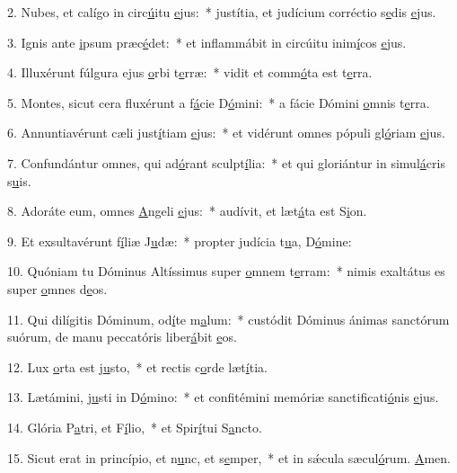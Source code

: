2. Nubes, et calígo in circ\uline{ú}itu \uline{e}jus:~* justítia, et judícium corréctio s\uline{e}dis \uline{e}jus.\par 
3. Ignis ante \uline{i}psum præc\uline{é}det:~* et inflammábit in circúitu inim\uline{í}cos \uline{e}jus.\par 
4. Illuxérunt fúlgura ejus \uline{o}rbi t\uline{e}rræ:~* vidit et comm\uline{ó}ta est t\uline{e}rra.\par 
5. Montes, sicut cera fluxérunt a f\uline{á}cie D\uline{ó}mini:~* a fácie Dómini \uline{o}mnis t\uline{e}rra.\par 
6. Annuntiavérunt cæli just\uline{í}tiam \uline{e}jus:~* et vidérunt omnes pópuli gl\uline{ó}riam \uline{e}jus.\par 
7. Confundántur omnes, qui ad\uline{ó}rant sculpt\uline{í}lia:~* et qui gloriántur in simul\uline{á}cris s\uline{u}is.\par 
8. Adoráte eum, omnes \uline{A}ngeli \uline{e}jus:~* audívit, et læt\uline{á}ta est S\uline{i}on.\par 
9. Et exsultavérunt f\uline{í}liæ J\uline{u}dæ:~* propter judícia t\uline{u}a, D\uline{ó}mine:\par 
10. Quóniam tu Dóminus Altíssimus super \uline{o}mnem t\uline{e}rram:~* nimis exaltátus es super \uline{o}mnes d\uline{e}os.\par 
11. Qui dilígitis Dóminum, od\uline{í}te m\uline{a}lum:~* custódit Dóminus ánimas sanctórum suórum, de manu peccatóris liber\uline{á}bit \uline{e}os.\par 
12. Lux \uline{o}rta est j\uline{u}sto,~* et rectis c\uline{o}rde læt\uline{í}tia.\par 
13. Lætámini, j\uline{u}sti in D\uline{ó}mino:~* et confitémini memóriæ sanctificati\uline{ó}nis \uline{e}jus.\par 
14. Glória P\uline{a}tri, et F\uline{í}lio,~* et Spir\uline{í}tui S\uline{a}ncto.\par 
15. Sicut erat in princípio, et n\uline{u}nc, et s\uline{e}mper,~* et in sǽcula sæcul\uline{ó}rum. \uline{A}men.\par 
